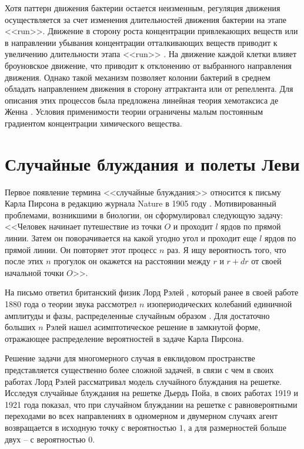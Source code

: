 Хотя паттерн движения бактерии остается неизменным, регуляция движения осуществляется за счет изменения длительностей движения бактерии на этапе <<run>>. Движение в сторону роста концентрации привлекающих веществ или в направлении убывания концентрации отталкивающих веществ приводит к увеличению длительности этапа <<run>> \cite{berg_chemotaxis_1972}. На движение каждой клетки влияет броуновское движение, что приводит к отклонению от выбранного направления движения. Однако такой механизм позволяет колонии бактерий в среднем обладать направлением движения в сторону аттрактанта или от репеллента. Для описания этих процессов была предложена линейная теория хемотаксиса де Женна \cite{de_gennes_chemotaxis_2004}. Условия применимости теории ограничены малым постоянным градиентом концентрации химического вещества.

\section{Случайные блуждания и полеты Леви}\label{sec:ch1/sec2}

Первое появление термина <<случайные блуждания>> относится к письму Карла Пирсона в редакцию журнала Nature в 1905 году \cite{pearson_problem_1905}. Мотивированный проблемами, возникшими в биологии, он сформулировал следующую задачу: <<Человек начинает путешествие из точки $O$ и проходит $l$ ярдов по прямой линии. Затем он поворачивается на какой угодно угол и проходит еще $l$ ярдов по прямой линии. Он повторяет этот процесс $n$ раз. Я ищу вероятность того, что после этих $n$ прогулок он окажется на расстоянии между $r$ и $r+dr$ от своей начальной точки $O$>>.

На письмо ответил британский физик Лорд Рэлей \cite{rayleigh_problem_1905}, который ранее в своей работе 1880 года о теории звука рассмотрел $n$ изопериодических колебаний единичной амплитуды и фазы, распределенные случайным образом \cite{rayleigh_lxi_1877}. Для достаточно больших $n$ Рэлей нашел асимптотическое решение в замкнутой форме, отражающее распределение вероятностей в задаче Карла Пирсона. 

Решение задачи для многомерного случая в евклидовом пространстве представляется существенно более сложной задачей, в связи с чем в своих работах Лорд Рэлей рассматривал модель случайного блуждания на решетке. Исследуя случайные блуждания на решетке Дьердь Пойа, в своих работах 1919 и 1921 года \cite{polya_uber_1921} показал, что при случайном блуждании на решетке с равновероятными переходами во всех направлениях в одномерном и двумерном случаях агент возвращается в исходную точку с вероятностью $1$, а для размерностей больше двух -- с вероятностью $0$.

